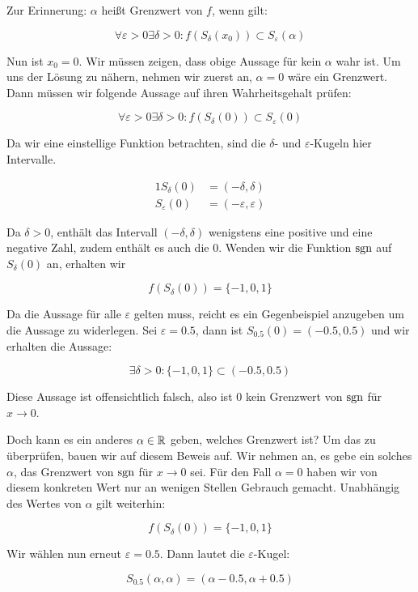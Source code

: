 \item Zur Erinnerung: $\alpha$ heißt Grenzwert von $f$, wenn gilt:

$$
\forall \varepsilon > 0 \exists \delta > 0 : f(S_\delta(x_0)) \subset S_\varepsilon(\alpha)
$$

Nun ist $x_0=0$. Wir müssen zeigen, dass obige Aussage für kein $\alpha$ wahr ist. Um uns der Lösung zu nähern, nehmen wir zuerst an, $\alpha=0$ wäre ein Grenzwert. Dann müssen wir folgende Aussage auf ihren Wahrheitsgehalt prüfen:

$$
\forall \varepsilon > 0 \exists \delta > 0 : f(S_\delta(0)) \subset S_\varepsilon(0)
$$

Da wir eine einstellige Funktion betrachten, sind die $\delta$- und $\varepsilon$-Kugeln hier Intervalle.

\begin{alignat*}{1}
S_\delta(0) &= (-\delta, \delta) \\
S_\varepsilon(0) &= (-\varepsilon, \varepsilon)
\end{alignat*}


Da $\delta > 0$, enthält das Intervall $(-\delta, \delta)$ wenigstens eine positive und eine negative Zahl, zudem enthält es auch die $0$. Wenden wir die Funktion $\text{sgn}$ auf $S_\delta(0)$ an, erhalten wir

$$
	f(S_\delta(0)) = \lbrace -1, 0, 1 \rbrace
$$

Da die Aussage für alle $\varepsilon$ gelten muss, reicht es ein Gegenbeispiel anzugeben um die Aussage zu widerlegen. Sei $\varepsilon = 0.5$, dann ist $S_{0.5}(0) = (-0.5, 0.5)$ und wir erhalten die Aussage:

$$
\exists \delta > 0 : \lbrace -1, 0, 1 \rbrace  \subset (-0.5, 0.5)
$$

Diese Aussage ist offensichtlich falsch, also ist $0$ kein Grenzwert von $\text{sgn}$ für $x \to 0$.

Doch kann es ein anderes $\alpha\in\mathbb{R}$ geben, welches Grenzwert ist? Um das zu überprüfen, bauen wir auf diesem Beweis auf. Wir nehmen an, es gebe ein solches $\alpha$, das Grenzwert von $\text{sgn}$ für $x \to 0$ sei. Für den Fall $\alpha=0$ haben wir von diesem konkreten Wert nur an wenigen Stellen Gebrauch gemacht. Unabhängig des Wertes von $\alpha$ gilt weiterhin:

$$
f(S_\delta(0)) = \lbrace -1, 0, 1 \rbrace
$$

Wir wählen nun erneut $\varepsilon = 0.5$. Dann lautet die $\varepsilon$-Kugel:

$$
	S_{0.5}(\alpha, \alpha) = ( \alpha - 0.5, \alpha + 0.5 )
$$

